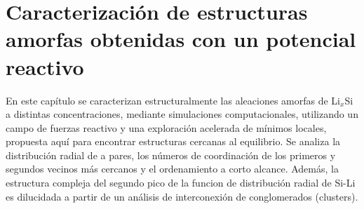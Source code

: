 \chapter{Caracterización de estructuras amorfas obtenidas con un potencial 
reactivo}\label{ch:caracterizacion}
\thispagestyle{empty}

\vspace{50pt}

\begin{adjustwidth}{50pt}{50pt}
    En este capítulo se caracterizan estructuralmente las aleaciones amorfas de
    Li$_x$Si a distintas concentraciones, mediante simulaciones computacionales,
    utilizando un campo de fuerzas reactivo y una exploración acelerada de mínimos
    locales, propuesta aquí para encontrar estructuras cercanas al equilibrio. Se
    analiza la distribución radial de a pares, los números de coordinación de los
    primeros y segundos vecinos más cercanos y el ordenamiento a corto alcance.
    Además, la estructura compleja del segundo pico de la funcion de distribución radial de Si-Li es 
    dilucidada a partir de un análisis de interconexión de conglomerados (clusters).
\end{adjustwidth}

\clearpage
\newpage
\thispagestyle{empty}
\mbox{}
\newpage












